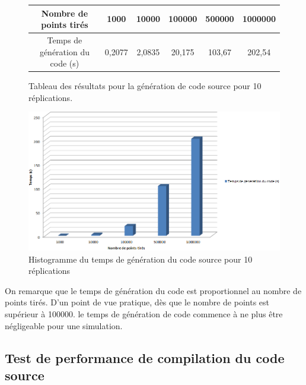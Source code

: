 \documentclass[a4paper,11pt]{report}
\begin{document}
\begin{figure}[h]
\begin{center}
\begin{tabular}{|c|c|c|c|c|c|}
\hline
Nombre de points tirés & 1000 & 10000 & 100000 & 500000 & 1000000 \\
\hline
Temps de génération du code (s) & 0,2077 & 2,0835 & 20,175 & 103,67 & 202,54 \\
\hline
\end{tabular}
\end{center}
\caption{Tableau des résultats pour la génération de code source pour 10 réplications.}
\end{figure}


\begin{figure}[!h]
   \begin{center}
   \includegraphics[scale = 0.55]{grapheGenerationCode10.PNG}
   \end{center}
  \caption{Histogramme du temps de génération du code source pour 10 réplications}
\end{figure}

\clearpage

\normalsize{
On remarque que le temps de génération du code est proportionnel au nombre de points tirés. D'un point de vue pratique, dès que le nombre de points est supérieur à 100000. le temps de génération de code commence à ne plus être négligeable pour une simulation.
} 

\subsection{Test de performance de compilation du code source}
\end{document}
